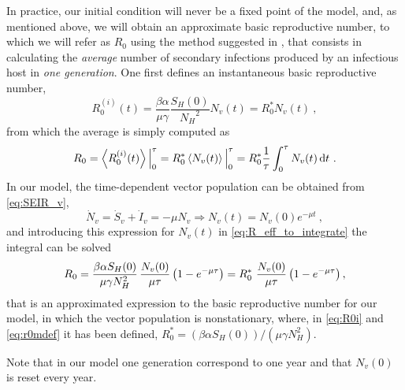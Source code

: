 In practice, our initial condition will never be a fixed point of the
model, and, as mentioned above, we will obtain an approximate basic
reproductive number, to which we will refer as $R_0$ using the method suggested
in \cite{GimenezRomero2022_PRE}, that consists in
calculating the \textit{average} number of secondary infections produced by
an infectious host in \textit{one generation}. One first defines an
instantaneous basic reproductive number,
\begin{equation}\label{eq:R0i}
    R_0^{(i)}(t)=\frac{\beta\alpha}{\mu\gamma}\frac{S_H(0)}{{N_H}^2}
    N_v(t)=R_0^* N_v(t) \ ,
\end{equation}
from which the average is simply computed as
\begin{equation}\label{eq:R_eff_to_integrate}
    R_0=\left<R_0^{(i)}(t)\right>\Big\rvert_{0}^{\tau}=
    R_0^*\left<N_v(t)\right>\Big\rvert_{0}^{\tau}=
    R_0^*\frac{1}{\tau}\int_0^{\tau}N_v(t)
    \, \mathrm{d} t \ .
\end{equation}
In our model, the time-dependent vector population can be obtained from
\cref{eq:SEIR_v},
\begin{equation}
    \dot{N}_v=\dot{S}_v+\dot{I}_v=-\mu N_v \Longrightarrow
    N_v(t)=N_v(0)e^{-\mu t} \ ,
\end{equation}
and introducing this expression for $N_v(t)$ in
\cref{eq:R_eff_to_integrate} the integral can be solved
\begin{equation}
    R_0={{\beta\alpha S_H(0)}\over{\mu\gamma N_H ^2}}
    \,\frac{N_v(0)}{\mu\tau}\left(1-e^{-\mu\tau}\right)=
    R_0^*\ \frac{N_v(0)}{\mu\tau}\left(1-e^{-\mu\tau}\right) ,
    \label{eq:r0mdef}
\end{equation}
that is an approximated expression to the basic reproductive number for our
model, in which the vector population is nonstationary,
where, in \cref{eq:R0i} and \cref{eq:r0mdef} it has been defined, $R_0^*=
    (\beta\alpha S_H(0))/(\mu\gamma N_H ^2)$.

Note that in our model one generation correspond to one year and that
$N_v(0)$ is reset every year.
